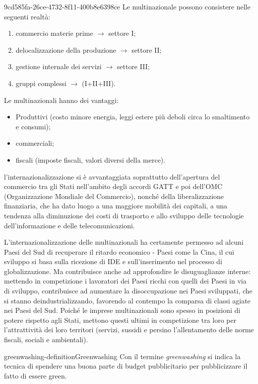 \documentclass[preview]{standalone}
\begin{document}
\begin{snippet}{9cd585fa-26ce-4732-8f11-400b8e6398ce}
    Le multinazionale possono consistere nelle seguenti realtà:
    \begin{enumerate}
        \item commercio materie prime \(\rightarrow\) settore I;
        \item delocalizzazione della produzione \(\rightarrow\) settore II;
        \item gestione internale dei servizi \(\rightarrow\) settore III;
        \item gruppi complessi \(\rightarrow\) (I+II+III).
    \end{enumerate}
    
    Le multinazionali hanno dei vantaggi:
    \begin{itemize}
        \item Produttivi (costo minore energia, leggi estere più deboli circa lo smaltimento e consumi);
        \item commerciali;
        \item fiscali (imposte fiscali, valori diversi della merce).
    \end{itemize}
    
    l'internazionalizzazione si è avvantaggiata
    soprattutto dell'apertura del commercio tra gli Stati nell'ambito degli accordi GATT
    e poi dell'OMC (Organizzazione Mondiale del Commercio),
    nonché della liberalizzazione finanziaria, che ha dato luogo a una maggiore mobilità dei capitali, a
    una tendenza alla diminuzione dei costi di trasporto e allo sviluppo delle tecnologie
    dell'informazione e delle telecomunicazioni.
    
    L'internazionalizzazione delle multinazionali ha certamente permesso ad alcuni Paesi del Sud di
    recuperare il ritardo economico - Paesi come la Cina, il cui sviluppo si basa sulla ricezione di IDE e
    sull'inserimento nel processo di globalizzazione. Ma contribuisce anche ad approfondire le
    disuguaglianze interne: mettendo in competizione i lavoratori dei Paesi ricchi con quelli dei Paesi
    in via di sviluppo, contribuisce ad aumentare la disoccupazione nei Paesi sviluppati, che si stanno
    deindustrializzando, favorendo al contempo la comparsa di classi agiate nei Paesi del Sud. Poiché
    le imprese multinazionali sono spesso in posizioni di potere rispetto agli Stati, mettono questi
    ultimi in competizione tra loro per l'attrattività dei loro territori (servizi, sussidi e persino
    l'allentamento delle norme fiscali, sociali e ambientali).
\end{snippet}

\begin{snippetdefinition}{greenwashing-definition}{Greenwashing}
    Con il termine \textit{greenwashing} si indica la tecnica di
    spendere una buona parte di budget pubblicitario per pubblicizzare il fatto di essere green.
\end{snippetdefinition}

\end{document}
